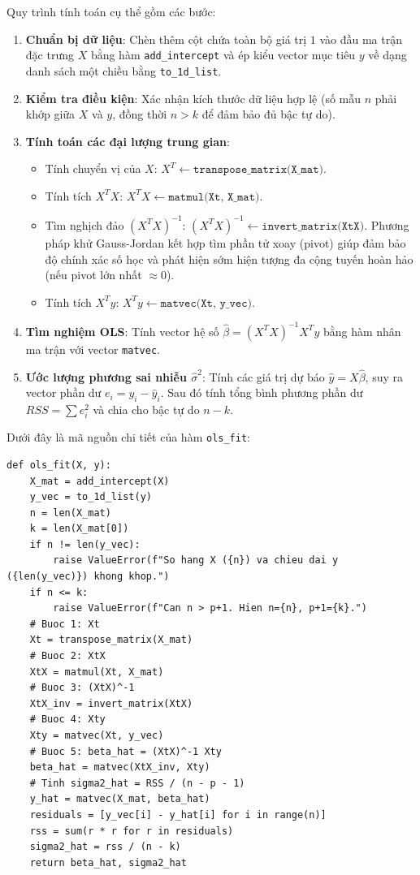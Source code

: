 Quy trình tính toán cụ thể gồm các bước:
\begin{enumerate}
    \item \textbf{Chuẩn bị dữ liệu}: Chèn thêm cột chứa toàn bộ giá trị $1$ vào đầu ma trận đặc trưng $X$ bằng hàm \texttt{add\_intercept} và ép kiểu vector mục tiêu $y$ về dạng danh sách một chiều bằng \texttt{to\_1d\_list}.
    \item \textbf{Kiểm tra điều kiện}: Xác nhận kích thước dữ liệu hợp lệ (số mẫu $n$ phải khớp giữa $X$ và $y$, đồng thời $n > k$ để đảm bảo đủ bậc tự do).
    \item \textbf{Tính toán các đại lượng trung gian}:
    \begin{itemize}
        \item Tính chuyển vị của $X$: $X^T \leftarrow \texttt{transpose\_matrix(X\_mat)}$.
        \item Tính tích $X^T X$: $X^T X \leftarrow \texttt{matmul(Xt, X\_mat)}$.
        \item Tìm nghịch đảo $(X^T X)^{-1}$: $(X^T X)^{-1} \leftarrow \texttt{invert\_matrix(XtX)}$. Phương pháp khử Gauss-Jordan kết hợp tìm phần tử xoay (pivot) giúp đảm bảo độ chính xác số học và phát hiện sớm hiện tượng đa cộng tuyến hoàn hảo (nếu pivot lớn nhất $\approx 0$).
        \item Tính tích $X^T y$: $X^T y \leftarrow \texttt{matvec(Xt, y\_vec)}$.
    \end{itemize}
    \item \textbf{Tìm nghiệm OLS}: Tính vector hệ số $\hat{\beta} = (X^T X)^{-1} X^T y$ bằng hàm nhân ma trận với vector \texttt{matvec}.
    \item \textbf{Ước lượng phương sai nhiễu $\hat{\sigma}^2$}: Tính các giá trị dự báo $\hat{y} = X\hat{\beta}$, suy ra vector phần dư $e_i = y_i - \hat{y}_i$. Sau đó tính tổng bình phương phần dư $RSS = \sum e_i^2$ và chia cho bậc tự do $n - k$.
\end{enumerate}
\newpage

Dưới đây là mã nguồn chi tiết của hàm \texttt{ols\_fit}:

\begin{lstlisting}[style = python]
def ols_fit(X, y):
    X_mat = add_intercept(X)
    y_vec = to_1d_list(y)
    n = len(X_mat)
    k = len(X_mat[0])
    if n != len(y_vec):
        raise ValueError(f"So hang X ({n}) va chieu dai y ({len(y_vec)}) khong khop.")
    if n <= k:
        raise ValueError(f"Can n > p+1. Hien n={n}, p+1={k}.")
    # Buoc 1: Xt
    Xt = transpose_matrix(X_mat)
    # Buoc 2: XtX
    XtX = matmul(Xt, X_mat)
    # Buoc 3: (XtX)^-1 
    XtX_inv = invert_matrix(XtX)
    # Buoc 4: Xty
    Xty = matvec(Xt, y_vec)
    # Buoc 5: beta_hat = (XtX)^-1 Xty
    beta_hat = matvec(XtX_inv, Xty)
    # Tinh sigma2_hat = RSS / (n - p - 1)
    y_hat = matvec(X_mat, beta_hat)
    residuals = [y_vec[i] - y_hat[i] for i in range(n)]
    rss = sum(r * r for r in residuals)
    sigma2_hat = rss / (n - k)
    return beta_hat, sigma2_hat
\end{lstlisting}
